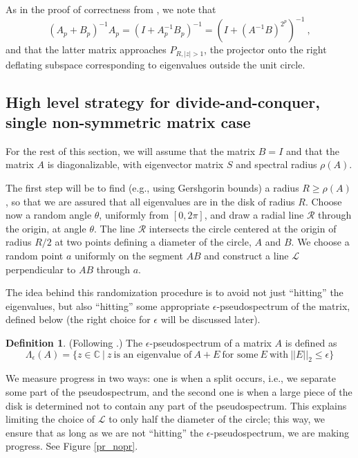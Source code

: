 \documentclass{article}
\theoremstyle{definition}
\newtheorem{definition}[theorem]{Definition}
\begin{document}
As in the proof of correctness from \cite{baidemmelgu94}, we note that
\[
(A_p+B_p)^{-1} A_p = (I+A_p^{-1} B_p)^{-1} = (I+(A^{-1}B)^{2^p})^{-1}~,
\]
and that the latter matrix approaches $P_{R, |z|>1}$,  the projector onto the right deflating subspace corresponding to eigenvalues outside the unit circle. 


\subsection{High level strategy for divide-and-conquer, single non-symmetric matrix case}
\label{sec:HLS:Nonsymmetric}

For the rest of this section, we will assume that the matrix $B = I$ and that the matrix $A$ is diagonalizable, with eigenvector matrix $S$ and spectral radius $\rho(A)$.

The first step will be to find (e.g., using Gershgorin bounds) a radius $R \geq \rho(A)$, so that we are assured that all eigenvalues are in the disk of radius $R$. Choose now a random angle $\theta$, uniformly from $[0, 2\pi]$, and draw a radial line $\mathcal{R}$ through the origin, at angle $\theta$. The line $\mathcal{R}$ intersects the circle centered at the origin of radius $R/2$ at two points defining a diameter of the circle, $A$ and $B$. We choose a random point $a$ uniformly on the segment $AB$ and construct a line $\mathcal{L}$ perpendicular to $AB$ through $a$.

The idea behind this randomization procedure is to avoid not just ``hitting'' the eigenvalues, but also ``hitting'' some appropriate $\epsilon$-pseudospectrum of the matrix, defined below (the right choice for $\epsilon$ will be discussed later).

\begin{definition} (Following \cite{TE05}.) The $\epsilon$-pseudospectrum of a matrix $A$ is defined as
\[
\Lambda_{\epsilon}(A) = \{z \in \mathbb{C} ~|~ z ~\mbox{is an eigenvalue of}~A+E~\mbox{for some}~E~\mbox{with}~||E||_2\leq \epsilon \}
\]
\end{definition}

We measure progress in two ways: one is when a split occurs, i.e., we separate some part of the pseudospectrum, and the second one is when a large piece of the disk is determined not to contain any part of the pseudospectrum. This explains limiting the choice of $\mathcal{L}$ to only half the diameter of the circle; this way, we ensure that as long as we are not ``hitting'' the $\epsilon$-pseudospectrum, we are making progress. See Figure \ref{pr_nopr}.
\end{document}
